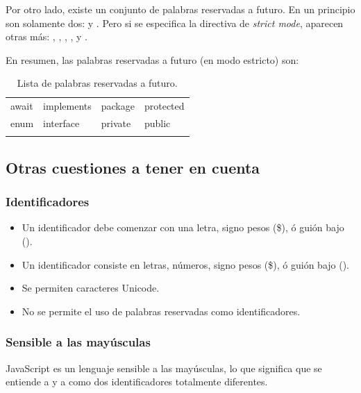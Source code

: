 Por otro lado, existe un conjunto de palabras reservadas a futuro. En un principio son solamente dos:  y . Pero si se especifica la directiva de \textit{strict mode}, aparecen otras más: , , , ,  y .

En resumen, las palabras reservadas a futuro (en modo estricto) son:

\begin{table}[!h]
\caption{Lista de palabras reservadas a futuro.}
\label{tab:futurereservedkeywords}
\centering
\begin{tabular}{l l l l}
\toprule
await & implements & package & protected\\
enum & interface & private & public\\
\bottomrule\\
\end{tabular}
\end{table}

\subsection{Otras cuestiones a tener en cuenta}

\subsubsection{Identificadores}

\begin{itemize}
\item Un identificador debe comenzar con una letra, signo pesos (\$), ó guión bajo (\textunderscore).
\item Un identificador consiste en letras, números, signo pesos (\$), ó guión bajo (\textunderscore).
\item Se permiten caracteres Unicode.
\item No se permite el uso de palabras reservadas como identificadores.
\end{itemize}

\subsubsection{Sensible a las mayúsculas}

JavaScript es un lenguaje sensible a las mayúsculas, lo que significa que se entiende a  y a  como dos identificadores totalmente diferentes.

